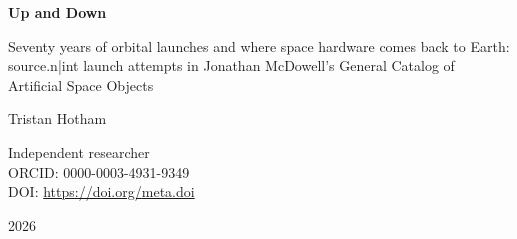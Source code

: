 \documentclass[11pt,a4paper]{article}
\begin{document}
\begin{center}
{\Large\bfseries Up and Down\par}
\vspace{0.4em}
{\large Seventy years of orbital launches and where space hardware comes back to Earth:\\{{source.n|int}} launch attempts in Jonathan McDowell's General Catalog of Artificial Space Objects\par}
\vspace{1.2em}
{\large Tristan Hotham\par}
\vspace{0.3em}
{\small Independent researcher\\
ORCID: 0000-0003-4931-9349\\
DOI: \href{https://doi.org/{{meta.doi}}}{https://doi.org/{{meta.doi}}}\par}
\vspace{0.8em}
2026
\end{center}
\end{document}
